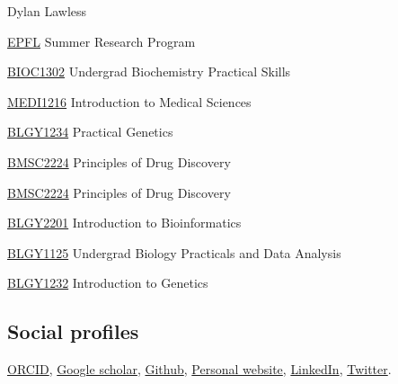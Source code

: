 \documentclass[12pt,a4paper]{article}
\begin{document}
\begin{cv}{Dylan Lawless}
\begin{cvlist}{}
\item[\href{https://www.epfl.ch/schools/sv/education/summer-research-program/}{EPFL}] Summer Research Program

\item[\href{http://webprod3.leeds.ac.uk/catalogue/dynmodules.asp?Y=201718&M=BIOL-1302}{BIOC1302}] Undergrad Biochemistry Practical Skills

\item[\href{http://webprod3.leeds.ac.uk/catalogue/dynmodules.asp?Y=201718&M=MEDI-1216}{MEDI1216}] Introduction to Medical Sciences 

\item[\href{http://webprod3.leeds.ac.uk/catalogue/dynmodules.asp?Y=201718&M=BLGY-1234}{BLGY1234}] Practical Genetics

\item[\href{http://webprod3.leeds.ac.uk/catalogue/dynmodules.asp?Y=201718&M=BMSC-2224}{BMSC2224}] Principles of Drug Discovery

\item[\href{http://webprod3.leeds.ac.uk/catalogue/dynmodules.asp?Y=201718&M=BMSC-2224}{BMSC2224}] Principles of Drug Discovery

\item[\href{http://webprod3.leeds.ac.uk/catalogue/dynmodules.asp?Y=201718&M=BLGY-2201}{BLGY2201}] Introduction to Bioinformatics

\item[\href{http://webprod3.leeds.ac.uk/catalogue/dynmodules.asp?Y=201718&M=BLGY-1125}{BLGY1125}] Undergrad Biology Practicals and Data Analysis

\item[\href{http://webprod3.leeds.ac.uk/catalogue/dynmodules.asp?Y=201718&M=BLGY-1232}{BLGY1232}] Introduction to Genetics
\end{cvlist}

\subsection*{Social profiles}
\href{https://orcid.org/0000-0001-8496-3725}{ORCID},
\href{https://scholar.google.com/citations?user=RPBxP1wAAAAJ&hl=en&oi=ao}{Google scholar},
\href{https://github.com/DylanLawless}{Github},
\href{https://lawlessgenomics.com}{Personal website},
\href{https://www.linkedin.com/in/dylan-lawless-human-genomics/}{LinkedIn}, 
\href{https://twitter.com/meddlaw}{Twitter}.


\end{cv}
\end{document}
